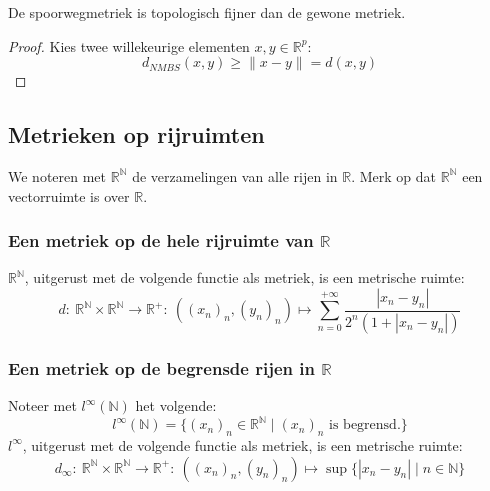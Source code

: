 \documentclass[main.tex]{subfiles}
\begin{document}
\begin{st}
  De spoorwegmetriek is topologisch fijner dan de gewone metriek.
  
  \begin{proof}
    Kies twee willekeurige elementen $x,y \in \mathbb{R}^{p}$:
    \[ d_{NMBS}(x,y) \ge \|x-y\| = d(x,y) \]
  \end{proof}
\end{st}

\subsection{Metrieken op rijruimten}
\label{sec:metr-op-rijr}

\begin{de}
  We noteren met $\mathbb{R}^{\mathbb{N}}$ de verzamelingen van alle rijen in $\mathbb{R}$.
  Merk op dat $\mathbb{R}^{\mathbb{N}}$ een vectorruimte is over $\mathbb{R}$.
\end{de}

\subsubsection{Een metriek op de hele rijruimte van $\mathbb{R}$}
\label{sec:een-metriek-op}

\begin{vb}
  $\mathbb{R}^{\mathbb{N}}$, uitgerust met de volgende functie als metriek, is een metrische ruimte:
  \[ d:\ \mathbb{R}^{\mathbb{N}} \times \mathbb{R}^{\mathbb{N}} \rightarrow \mathbb{R}^{+}:\ ((x_{n})_{n},(y_{n})_{n}) \mapsto \sum_{n=0}^{+\infty}\frac{|x_{n}-y_{n}|}{2^{n}(1+|x_{n}-y_{n}|)} \]
\end{vb}

\subsubsection{Een metriek op de begrensde rijen in $\mathbb{R}$}
\label{sec:een-metriek-op-1}

\begin{vb}
  Noteer met $l^{\infty}(\mathbb{N})$ het volgende:
  \[ l^{\infty}(\mathbb{N}) = \{ (x_{n})_{n} \in \mathbb{R}^{\mathbb{N}} \mid (x_{n})_{n} \text{ is begrensd.}\} \]
  $l^{\infty}$, uitgerust met de volgende functie als metriek, is een metrische ruimte:
  \[ d_{\infty}:\ \mathbb{R}^{\mathbb{N}} \times \mathbb{R}^{\mathbb{N}} \rightarrow \mathbb{R}^{+}:\ ((x_{n})_{n},(y_{n})_{n}) \mapsto \sup\{|x_{n}-y_{n}| \mid n\in \mathbb{N}\} \]
\end{vb}
\end{document}
